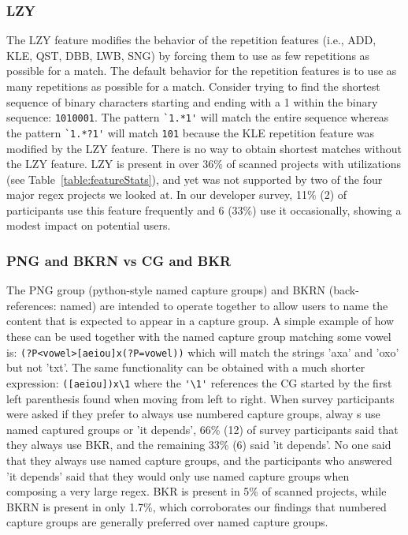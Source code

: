\subsubsection{LZY}
The LZY feature modifies the behavior of the repetition features (i.e., ADD, KLE, QST, DBB, LWB, SNG) by forcing them to use as few repetitions as possible for a match.  The default behavior for the repetition features is to use as many repetitions as possible for a match.  Consider trying to find the shortest sequence of binary characters starting and ending with a 1 within the binary sequence: {\tt 1010001}. The pattern \verb!`1.*1'! will match the entire sequence whereas the pattern \verb!`1.*?1'! will match {\tt 101} because the KLE repetition feature was modified by the LZY feature.  There is no way to obtain shortest matches without the LZY feature.  LZY is present in over 36\% of scanned projects with utilizations (see Table~\ref{table:featureStats}), and yet was not supported by two of the four major regex projects we looked at.
In our developer survey, 11\% (2) of participants use this feature frequently and 6 (33\%) use it occasionally, showing a modest impact on potential users.

\subsubsection{PNG and BKRN vs CG and BKR}
The PNG group (python-style named capture groups) and BKRN (back-references: named) are intended to operate together to allow users to name the content that is expected to appear in a capture group.  A simple example of how these can be used together with the named capture group matching some vowel is:
\verb!(?P<vowel>[aeiou]x(?P=vowel))! which will match the strings 'axa' and 'oxo' but not 'txt'.  The same functionality can be obtained with a much shorter expression: \verb!([aeiou])x\1! where the \verb!'\1'! references the CG started by the first left parenthesis found when moving from left to right.  When survey participants were asked if they prefer to always use numbered capture groups, alway s use named captured groups or 'it depends', 66\% (12) of survey participants said that they always use BKR, and the remaining 33\% (6) said 'it depends'.  No one said that they always use named capture groups, and the participants who answered 'it depends' said that they would only use named capture groups when composing a very large regex.  BKR is present in 5\% of scanned projects, while BKRN is present in only 1.7\%, which corroborates our findings that numbered capture groups are generally preferred over named capture groups.

